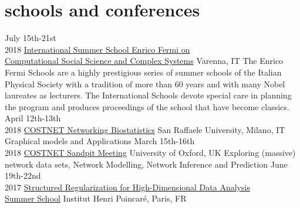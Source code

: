 \documentclass[]{cv-style}     %
\begin{document}
\pagebreak

\section{schools and conferences}
\begin{entrylist}
\entry
{July 15th-21st\\2018}
{\href{https://sites.google.com/view/varennacs2018}{International Summer School Enrico Fermi on\\Computational Social Science and Complex Systems}}
{Varenna, IT}
{The Enrico Fermi Schools are a highly prestigious series of summer schools of the Italian Physical Society with a tradition of more than 60 years and with many Nobel laureates as lecturers. The International Schools devote special care in planning the program and produces proceedings of the school that have become classics. }
\entry
{April 12th-13th\\2018}
{\href{http://ibs-italy.org/?page_id=703&lang=en}{COSTNET Networking Biostatistics}}
{San Raffaele University, Milano, IT}
{Graphical models and Applications}
\entry
{March 15th-16th\\2018}
{\href{https://www.oxforduniversitystores.co.uk/conferences-events/statistics/statistics/costnet-sandpit-meeting}{COSTNET Sandpit Meeting}}
{University of Oxford, UK}
{Exploring (massive) network data sets, Network Modelling, Network Inference and Prediction}
\entry
{June 19th-22nd\\2017}
{\href{https://regularize-in-paris.github.io/}{Structured Regularization for High-Dimensional Data Analysis\\Summer School}}
{Institut Henri Poincaré, Paris, FR}
{}
\end{entrylist}

\end{document}
